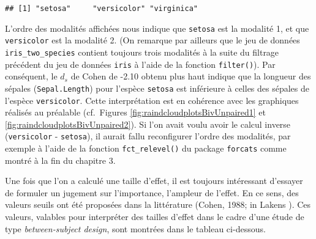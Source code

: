 \documentclass[
  french,
]{book}
\newenvironment{Shaded}{\begin{snugshade}}{\end{snugshade}}
\newcommand{\KeywordTok}[1]{\textcolor[rgb]{0.13,0.29,0.53}{\textbf{#1}}}
\newcommand{\NormalTok}[1]{#1}
\newcommand{\OperatorTok}[1]{\textcolor[rgb]{0.81,0.36,0.00}{\textbf{#1}}}
\begin{document}
\begin{Shaded}
\end{Shaded}

\begin{verbatim}
## [1] "setosa"     "versicolor" "virginica"
\end{verbatim}

L'ordre des modalités affichées nous indique que \texttt{setosa} est la modalité 1, et que \texttt{versicolor} est la modalité 2. (On remarque par ailleurs que le jeu de données \texttt{iris\_two\_species} contient toujours trois modalités à la suite du filtrage précédent du jeu de données \texttt{iris} à l'aide de la fonction \texttt{filter()}). Par conséquent, le \(d_{s}\) de Cohen de -2.10 obtenu plus haut indique que la longueur des sépales (\texttt{Sepal.Length}) pour l'espèce \texttt{setosa} est inférieure à celles des sépales de l'espèce \texttt{versicolor}. Cette interprétation est en cohérence avec les graphiques réalisés au préalable (cf.~Figures \ref{fig:raindcloudplotsBivUnpaired1} et \ref{fig:raindcloudplotsBivUnpaired2}). Si l'on avait voulu avoir le calcul inverse (\texttt{versicolor} - \texttt{setosa}), il aurait fallu reconfigurer l'ordre des modalités, par exemple à l'aide de la fonction \texttt{fct\_relevel()} du package \texttt{forcats} comme montré à la fin du chapitre 3.

Une fois que l'on a calculé une taille d'effet, il est toujours intéressant d'essayer de formuler un jugement sur l'importance, l'ampleur de l'effet. En ce sens, des valeurs seuils ont été proposées dans la littérature (Cohen, 1988; in Lakens \autocite*{lakensCalculatingReportingEffect2013}). Ces valeurs, valables pour interpréter des tailles d'effet dans le cadre d'une étude de type \emph{between-subject design}, sont montrées dans le tableau ci-dessous.

\providecommand{\docline}[3]{\noalign{\global\setlength{\arrayrulewidth}{#1}}\arrayrulecolor[HTML]{#2}\cline{#3}}

\setlength{\tabcolsep}{0pt}

\renewcommand*{\arraystretch}{1.5}
\end{document}
